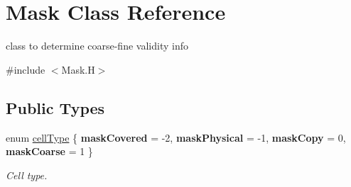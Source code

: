 \hypertarget{class_mask}{\section{Mask Class Reference}
\label{class_mask}
}


class to determine coarse-\/fine validity info  




{\ttfamily \#include $<$Mask.\-H$>$}

\subsection*{Public Types}
\begin{DoxyCompactItemize}
\item 
enum \hyperlink{class_mask_a81350474ba1eed5e378837d0772d86c2}{cell\-Type} \{ {\bfseries mask\-Covered} = -\/2, 
{\bfseries mask\-Physical} = -\/1, 
{\bfseries mask\-Copy} = 0, 
{\bfseries mask\-Coarse} = 1
 \}
\begin{DoxyCompactList}\small\item\em Cell type. \end{DoxyCompactList}\end{DoxyCompactItemize}
